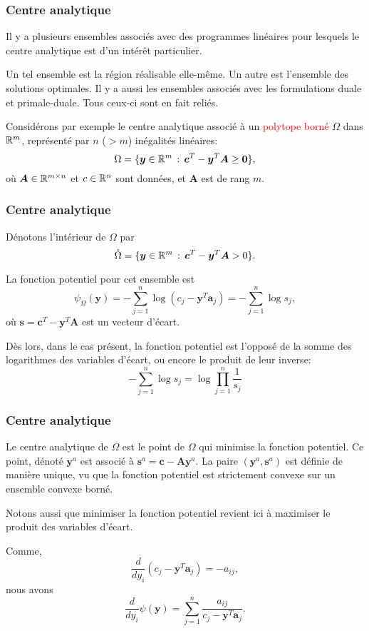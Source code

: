 \documentclass[usepdftitle=false, aspectratio=169]{beamer}
\def\ba{\boldsymbol{a}}
\def\bc{\boldsymbol{c}}
\def\bs{\boldsymbol{s}}
\def\by{\boldsymbol{y}}
\def\bA{\boldsymbol{A}}
\def\bzero{\boldsymbol{0}}
\begin{document}
\begin{frame}
\frametitle{Centre analytique}

Il y a plusieurs ensembles associés avec des programmes linéaires pour lesquels le centre analytique est d'un intérêt particulier.

\mbox{}

Un tel ensemble est la région réalisable elle-même. Un autre est l'ensemble des solutions optimales. Il y a aussi les ensembles associés avec les formulations duale et primale-duale. Tous ceux-ci sont en fait reliés.

\mbox{}

Considérons par exemple le centre analytique associé à un \textcolor{red}{polytope borné} $\Omega$ dans ${\mathbb{R}}^m$, représenté par $n$ ($> m$) inégalités linéaires:
\[
\Omega = \lbrace \by \in \RR^m \,:\, \bc^T - \by^T \bA \geq \bzero \rbrace,
\]
où $\bA \in \RR^{m \times n}$ et $c \in {\mathbb{R}}^n$ sont données, et $\bA$ est de rang $m$.

\end{frame}

\begin{frame}
\frametitle{Centre analytique}

Dénotons l'intérieur de $\Omega$ par
\[
\mathring{\Omega} = \lbrace \by \in \RR^m \,:\, \bc^T - \by^T\bA > 0 \rbrace.
\]

\mbox{}

La fonction potentiel pour cet ensemble est
\[
\psi_{\Omega} (\by) = - \sum_{j = 1}^n \log (c_j - \by^T\ba_j) = -\sum_{j = 1}^n \log s_j,
\]
où $\bs = \bc^T - \by^T\bA$ est un vecteur d'écart.

\mbox{}

Dès lors, dans le cas présent, la fonction potentiel est l'opposé de la somme des logarithmes des variables d'écart, ou encore le produit de leur inverse:
$$
-\sum_{j = 1}^n \log s_j = \log \prod_{j = 1}^n \frac{1}{s_j}
$$

\end{frame}

\begin{frame}
\frametitle{Centre analytique}

Le centre analytique de $\Omega$ est le point de $\Omega$ qui minimise la fonction potentiel. Ce point, dénoté $\by^a$ est associé à $\bs^a = \bc - \bA\by^a$. La paire $(\by^a, \bs^a)$ est définie de manière unique, vu que la fonction potentiel est strictement convexe sur un ensemble convexe borné.

\mbox{}

Notons aussi que minimiser la fonction potentiel revient ici à maximiser le produit des variables d'écart.

\mbox{}

Comme,
$$
\frac{d}{dy_i} (c_j-\by^T\ba_j) = -a_{ij},
$$
nous avons
$$
\frac{d}{dy_i} \psi(\by) = \sum_{j = 1}^n \frac{a_{ij}}{c_j - \by^T\ba_j}.
$$

\end{frame}
\end{document}
